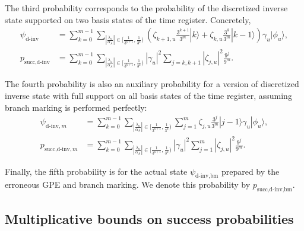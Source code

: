 \documentclass[letterpaper,onecolumn,11pt,accepted=2026-02-14]{quantumarticle}
\newcommand{\abs}[1]{\left\lvert#1\right\rvert}
\theoremstyle{remark}
\theoremstyle{plain}
\newcommand{\ket}[1]{|#1\rangle}
\begin{document}
The third probability corresponds to the probability of the discretized inverse state supported on two basis states of the time register. Concretely,
\begin{equation}
\begin{aligned}
    \psi_{\text{d-inv}}&=
    \sum_{k=0}^{m-1}\sum_{\abs{\frac{\lambda_u}{\alpha_A}}\in\big[\frac{1}{3^{k+1}},\frac{1}{3^k}\big)}
    \left(\zeta_{k+1,u}\frac{3^{k+1}}{3^m}\ket{k}+\zeta_{k,u}\frac{3^k}{3^m}\ket{k-1}\right)\gamma_u\ket{\phi_u},\\
    p_{\text{succ,d-inv}}&=\sum_{k=0}^{m-1}\sum_{\abs{\frac{\lambda_u}{\alpha_A}}\in\big[\frac{1}{3^{k+1}},\frac{1}{3^k}\big)}
    \abs{\gamma_u}^2
    \sum_{j=k,k+1}\abs{\zeta_{j,u}}^2\frac{9^{j}}{9^m}.
\end{aligned}
\end{equation}

The fourth probability is also an auxiliary probability for a version of discretized inverse state with full support on all basis states of the time register, assuming branch marking is performed perfectly:
\begin{equation}
\begin{aligned}
    \psi_{\text{d-inv},m}&=
    \sum_{k=0}^{m-1}\sum_{\abs{\frac{\lambda_u}{\alpha_A}}\in\big[\frac{1}{3^{k+1}},\frac{1}{3^k}\big)}
    \sum_{j=1}^{m}
    \zeta_{j,u}\frac{3^{j}}{3^m}
    \ket{j-1}
    \gamma_u\ket{\phi_u},\\
    p_{\text{succ,d-inv},m}&=
    \sum_{k=0}^{m-1}\sum_{\abs{\frac{\lambda_u}{\alpha_A}}\in\big[\frac{1}{3^{k+1}},\frac{1}{3^k}\big)}
    \abs{\gamma_u}^2\sum_{j=1}^{m}\abs{\zeta_{j,u}}^2\frac{9^{j}}{9^m}.
\end{aligned}
\end{equation}

Finally, the fifth probability is for the actual state $\psi_{\text{d-inv,bm}}$ prepared by the erroneous GPE and branch marking. We denote this probability by $p_{\text{succ,d-inv,bm}}$.

\subsection{Multiplicative bounds on success probabilities}
\label{append:multi_bounds}
\end{document}
